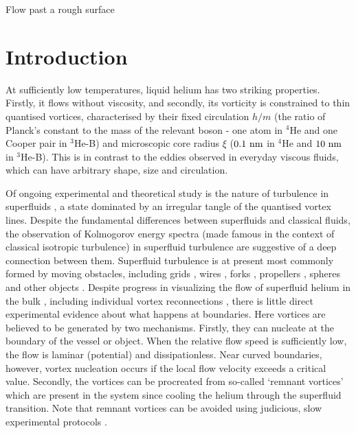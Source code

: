 \begin{chapter}{\label{cha:afm}Flow past a rough surface}
\section{Introduction}
At sufficiently low temperatures, liquid helium has two striking
properties.  Firstly, it flows without viscosity, and secondly,
its vorticity is constrained to
thin quantised vortices, characterised by their fixed circulation
$h/m$ (the ratio of Planck's constant to
the mass of the relevant boson - one atom in $^4$He and one Cooper pair 
in $^3$He-B) and microscopic core radius $\xi$ 
($0.1~\rm nm$ in $^4$He and $10~\rm nm$ in $^3$He-B).  
This is in contrast to the eddies observed in everyday viscous fluids, which can have arbitrary shape, size and circulation.  

Of ongoing experimental and theoretical study is the nature of 
turbulence in superfluids 
\cite{Barenghi2014,Bradley11,PhysRevLett.115.155303,PhysRevLett.110.014502}, a state 
dominated by an irregular tangle of the quantised vortex lines.  Despite the fundamental differences between superfluids and classical fluids, the observation of Kolmogorov energy spectra (made famous in the context of classical isotropic turbulence) in superfluid turbulence \cite{Barenghi2014} are suggestive of a deep connection between them.  Superfluid turbulence is at present most commonly formed by moving obstacles, including grids \cite{Davis2000,brad05}, wires \cite{Guenault1986,Bradley2011,Fisher2001}, forks \cite{Blaauwgeers2007,Bradley2012}, propellers \cite{Tabeling1998,Salort}, spheres \cite{Schoepe1995} and other objects \cite{VinenSkrbek2008}.
Despite progress in visualizing the flow of superfluid helium in the
bulk \cite{PhysRevLett.115.155303,PhysRevB.92.064519}, including individual vortex reconnections
\cite{Bewley09}, there is little direct experimental evidence
about what happens at boundaries.
Here vortices are believed to be generated by two mechanisms.  Firstly, 
they can nucleate at the boundary of the vessel or object.  
When the relative flow speed is sufficiently low, the flow is laminar 
{(potential)} and dissipationless.  
{Near curved boundaries, however, vortex nucleation occurs if
the local flow velocity exceeds a critical value.} 
Secondly, the vortices can be procreated from so-called `remnant vortices' 
which are present in the system since cooling the helium through the superfluid transition.  Note that remnant vortices can be avoided using judicious, slow experimental protocols \cite{PhysRevB.76.020504}. 


\end{chapter}
